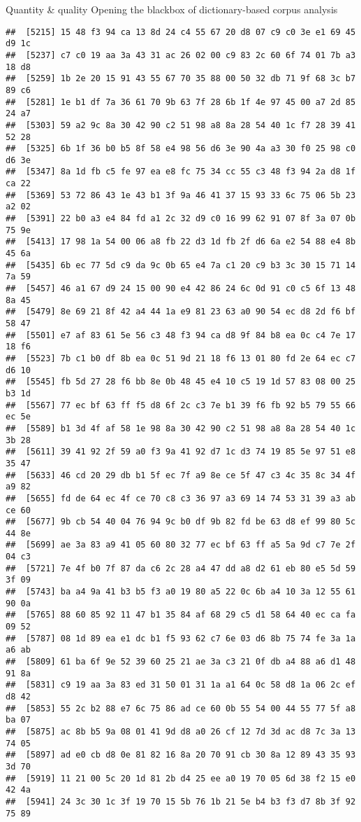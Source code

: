 \documentclass[
  ignorenonframetext,
]{beamer}
\begin{document}
\begin{frame}[fragile]{Quantity \& quality \textbar{} Opening the
blackbox of dictionary-based corpus analysis}
\begin{verbatim}
##  [5215] 15 48 f3 94 ca 13 8d 24 c4 55 67 20 d8 07 c9 c0 3e e1 69 45 d9 1c
##  [5237] c7 c0 19 aa 3a 43 31 ac 26 02 00 c9 83 2c 60 6f 74 01 7b a3 18 d8
##  [5259] 1b 2e 20 15 91 43 55 67 70 35 88 00 50 32 db 71 9f 68 3c b7 89 c6
##  [5281] 1e b1 df 7a 36 61 70 9b 63 7f 28 6b 1f 4e 97 45 00 a7 2d 85 24 a7
##  [5303] 59 a2 9c 8a 30 42 90 c2 51 98 a8 8a 28 54 40 1c f7 28 39 41 52 28
##  [5325] 6b 1f 36 b0 b5 8f 58 e4 98 56 d6 3e 90 4a a3 30 f0 25 98 c0 d6 3e
##  [5347] 8a 1d fb c5 fe 97 ea e8 fc 75 34 cc 55 c3 48 f3 94 2a d8 1f ca 22
##  [5369] 53 72 86 43 1e 43 b1 3f 9a 46 41 37 15 93 33 6c 75 06 5b 23 a2 02
##  [5391] 22 b0 a3 e4 84 fd a1 2c 32 d9 c0 16 99 62 91 07 8f 3a 07 0b 75 9e
##  [5413] 17 98 1a 54 00 06 a8 fb 22 d3 1d fb 2f d6 6a e2 54 88 e4 8b 45 6a
##  [5435] 6b ec 77 5d c9 da 9c 0b 65 e4 7a c1 20 c9 b3 3c 30 15 71 14 7a 59
##  [5457] 46 a1 67 d9 24 15 00 90 e4 42 86 24 6c 0d 91 c0 c5 6f 13 48 8a 45
##  [5479] 8e 69 21 8f 42 a4 44 1a e9 81 23 63 a0 90 54 ec d8 2d f6 bf 58 47
##  [5501] e7 af 83 61 5e 56 c3 48 f3 94 ca d8 9f 84 b8 ea 0c c4 7e 17 18 f6
##  [5523] 7b c1 b0 df 8b ea 0c 51 9d 21 18 f6 13 01 80 fd 2e 64 ec c7 d6 10
##  [5545] fb 5d 27 28 f6 bb 8e 0b 48 45 e4 10 c5 19 1d 57 83 08 00 25 b3 1d
##  [5567] 77 ec bf 63 ff f5 d8 6f 2c c3 7e b1 39 f6 fb 92 b5 79 55 66 ec 5e
##  [5589] b1 3d 4f af 58 1e 98 8a 30 42 90 c2 51 98 a8 8a 28 54 40 1c 3b 28
##  [5611] 39 41 92 2f 59 a0 f3 9a 41 92 d7 1c d3 74 19 85 5e 97 51 e8 35 47
##  [5633] 46 cd 20 29 db b1 5f ec 7f a9 8e ce 5f 47 c3 4c 35 8c 34 4f a9 82
##  [5655] fd de 64 ec 4f ce 70 c8 c3 36 97 a3 69 14 74 53 31 39 a3 ab ce 60
##  [5677] 9b cb 54 40 04 76 94 9c b0 df 9b 82 fd be 63 d8 ef 99 80 5c 44 8e
##  [5699] ae 3a 83 a9 41 05 60 80 32 77 ec bf 63 ff a5 5a 9d c7 7e 2f 04 c3
##  [5721] 7e 4f b0 7f 87 da c6 2c 28 a4 47 dd a8 d2 61 eb 80 e5 5d 59 3f 09
##  [5743] ba a4 9a 41 b3 b5 f3 a0 19 80 a5 22 0c 6b a4 10 3a 12 55 61 90 0a
##  [5765] 88 60 85 92 11 47 b1 35 84 af 68 29 c5 d1 58 64 40 ec ca fa 09 52
##  [5787] 08 1d 89 ea e1 dc b1 f5 93 62 c7 6e 03 d6 8b 75 74 fe 3a 1a a6 ab
##  [5809] 61 ba 6f 9e 52 39 60 25 21 ae 3a c3 21 0f db a4 88 a6 d1 48 91 8a
##  [5831] c9 19 aa 3a 83 ed 31 50 01 31 1a a1 64 0c 58 d8 1a 06 2c ef d8 42
##  [5853] 55 2c b2 88 e7 6c 75 86 ad ce 60 0b 55 54 00 44 55 77 5f a8 ba 07
##  [5875] ac 8b b5 9a 08 01 41 9d d8 a0 26 cf 12 7d 3d ac d8 7c 3a 13 74 05
##  [5897] ad e0 cb d8 0e 81 82 16 8a 20 70 91 cb 30 8a 12 89 43 35 93 3d 70
##  [5919] 11 21 00 5c 20 1d 81 2b d4 25 ee a0 19 70 05 6d 38 f2 15 e0 42 4a
##  [5941] 24 3c 30 1c 3f 19 70 15 5b 76 1b 21 5e b4 b3 f3 d7 8b 3f 92 75 89

\end{verbatim}
\end{frame}
\end{document}
